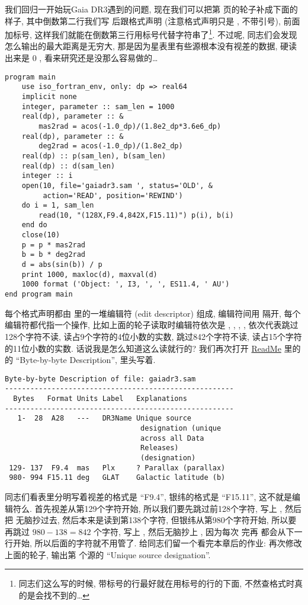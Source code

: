 我们回归一开始玩Gaia DR3遇到的问题, 现在我们可以把第 \pageref{gaiadr3.sam} 页的轮子补成下面的样子, 其中倒数第二行我们写  后跟格式声明 (注意格式声明只是 , 不带引号), 前面加标号, 这样我们就能在倒数第三行用标号代替字符串了\footnote{同志们这么写的时候, 带标号的行最好就在用标号的行的下面, 不然查格式时真的是会找不到的\dots{}}. 不过呢, 同志们会发现怎么输出的最大距离是无穷大, 那是因为星表里有些源根本没有视差的数据, 硬读出来是 $ 0 $ , 看来研究还是没那么容易做的\dots{}
\begin{lstlisting}
program main
    use iso_fortran_env, only: dp => real64
    implicit none
    integer, parameter :: sam_len = 1000
    real(dp), parameter :: &
        mas2rad = acos(-1.0_dp)/(1.8e2_dp*3.6e6_dp)
    real(dp), parameter :: &
        deg2rad = acos(-1.0_dp)/(1.8e2_dp)
    real(dp) :: p(sam_len), b(sam_len)
    real(dp) :: d(sam_len)
    integer :: i
    open(10, file='gaiadr3.sam ', status='OLD', &
         action='READ', position='REWIND')
    do i = 1, sam_len
        read(10, "(128X,F9.4,842X,F15.11)") p(i), b(i)
    end do
    close(10)
    p = p * mas2rad
    b = b * deg2rad
    d = abs(sin(b)) / p
    print 1000, maxloc(d), maxval(d)
    1000 format ('Object: ', I3, ', ', ES11.4, ' AU')
end program main
\end{lstlisting}

每个格式声明都由 \ttt{()} 里的一堆编辑符 (edit descriptor) 组成, 编辑符间用 \ttt{,} 隔开, 每个编辑符都代指一个操作, 比如上面的轮子读取时编辑符依次是 , , , , 依次代表跳过128个字符不读, 读占9个字符的4位小数的实数, 跳过842个字符不读, 读占15个字符的11位小数的实数. 话说我是怎么知道这么读就行的? 我们再次打开 \href{https://cdsarc.cds.unistra.fr/viz-bin/ReadMe/I/355?format=html&tex=true}{ReadMe} 里的  的 ``Byte-by-byte Description'', 里头写着. 
\begin{lstlisting}
Byte-by-byte Description of file: gaiadr3.sam 
------------------------------------------------------
  Bytes   Format Units Label   Explanations
------------------------------------------------------
   1-  28  A28   ---   DR3Name Unique source
                                designation (unique
                                across all Data
                                Releases)
                                (designation)
 129- 137  F9.4  mas   Plx     ? Parallax (parallax)
 980- 994 F15.11 deg   GLAT    Galactic latitude (b)
\end{lstlisting}
同志们看表里分明写着视差的格式是 ``F9.4'', 银纬的格式是 ``F15.11'', 这不就是编辑符么. 首先视差从第129个字符开始, 所以我们要先跳过前128个字符, 写上 , 然后把  无脑抄过去, 然后本来是读到第138个字符, 但银纬从第980个字符开始, 所以要再跳过 $ 980-138=842 $ 个字符, 写上 , 然后无脑抄上 , 因为每次  完再  都会从下一行开始, 所以后面的字符就不用管了. 给同志们留一个看完本章后的作业: 再次修改上面的轮子, 输出第  个源的 ``Unique source designation''. 

